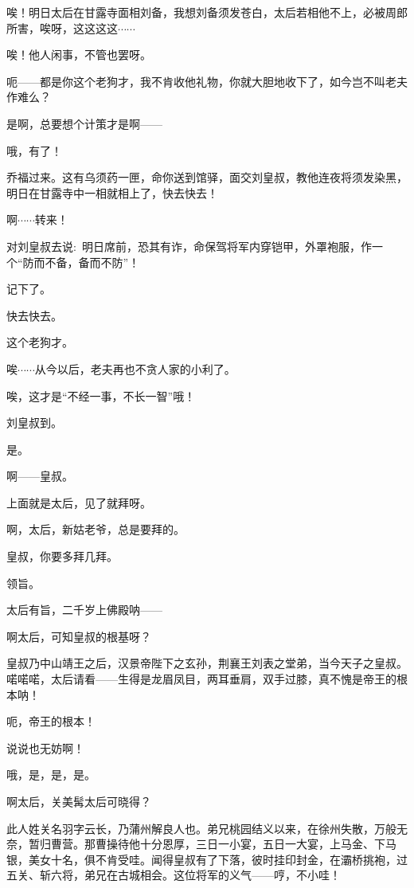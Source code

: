 {{唉！明日太后在甘露寺面相刘备，我想刘备须发苍白，太后若相他不上，必被周郎所害，唉呀，这这这这$\cdots{}\cdots{}$

唉！他人闲事，不管也罢呀。

呃------都是你这个老狗才，我不肯收他礼物，你就大胆地收下了，如今岂不叫老夫作难么？

是啊，总要想个计策才是啊------

哦，有了！

乔福过来。这有乌须药一匣，命你送到馆驿，面交刘皇叔，教他连夜将须发染黑，明日在甘露寺中一相就相上了，快去快去！

啊$\cdots{}\cdots{}$转来！

对刘皇叔去说:~明日席前，恐其有诈，命保驾将军内穿铠甲，外罩袍服，作一个``防而不备，备而不防''！

记下了。

快去快去。

这个老狗才。

唉$\cdots{}\cdots{}$从今以后，老夫再也不贪人家的小利了。

唉，这才是``不经一事，不长一智''哦！

\vspace{5pt}

刘皇叔到。

是。

啊------皇叔。

上面就是太后，见了就拜呀。

啊，太后，新姑老爷，总是要拜的。

皇叔，你要多拜几拜。

领旨。

太后有旨，二千岁上佛殿呐------

啊太后，可知皇叔的根基呀？

皇叔乃中山靖王之后，汉景帝陛下之玄孙，荆襄王刘表之堂弟，当今天子之皇叔。喏喏喏，太后请看------生得是龙眉凤目，两耳垂肩，双手过膝，真不愧是帝王的根本呐！

呃，帝王的根本！

说说也无妨啊！

哦，是，是，是。

啊太后，关美髯太后可晓得？

此人姓关名羽字云长，乃蒲州解良人也。弟兄桃园结义以来，在徐州失散，万般无奈，暂归曹营。那曹操待他十分恩厚，三日一小宴，五日一大宴，上马金、下马银，美女十名，俱不肯受哇。闻得皇叔有了下落，彼时挂印封金，在灞桥挑袍，过五关、斩六将，弟兄在古城相会。这位将军的义气------哼，不小哇！

}}
